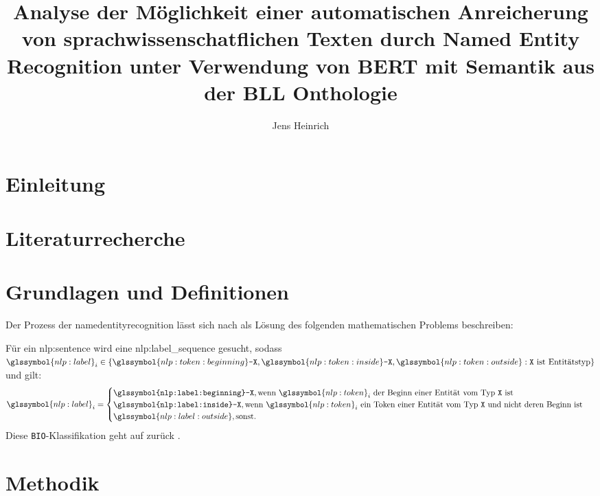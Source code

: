 \documentclass[
german,
]{bachelor}
\author{Jens Heinrich}
\title{%
Analyse der Möglichkeit
einer automatischen Anreicherung von sprachwissenschatflichen Texten
durch Named Entity Recognition
unter Verwendung von BERT
mit Semantik aus der BLL Onthologie%
}
\begin{document}
\maketitle

\tableofcontents

\section{Einleitung}

\section{Literaturrecherche}

\section{Grundlagen und Definitionen}
Der Prozess der \gls{namedentityrecognition}
lässt sich nach \autocite{Liang_2020} als Lösung des folgenden mathematischen Problems beschreiben:

\begin{prob}{}
Für ein \gls{nlp:sentence} 
wird eine \gls{nlp:label_sequence}  gesucht,
sodass \(
\glssymbol{nlp:label}_i \in
\left\lbrace
	\glssymbol{nlp:token:beginning}\texttt{-X},
	\glssymbol{nlp:token:inside}\texttt{-X},
	\glssymbol{nlp:token:outside}
	:
	\text{\texttt{X} ist Entitätstyp}
\right\rbrace
\)
und gilt:
\[
	\glssymbol{nlp:label}_i =
	\begin{cases}
		\texttt{\glssymbol{nlp:label:beginning}-X},
		\text{wenn \(\glssymbol{nlp:token}_i\)
		der Beginn einer Entität vom Typ \(\texttt{X}\) ist
	}\\
	\texttt{\glssymbol{nlp:label:inside}-X},
		\text{wenn \(\glssymbol{nlp:token}_i\)
		ein Token einer Entität vom Typ \(\texttt{X}\)
		und nicht deren Beginn ist
	}\\
	\glssymbol{nlp:label:outside}, \text{sonst}.
\end{cases}
\]
Diese \texttt{BIO}-Klassifikation geht auf \citeauthor{10.1145/2396761.2398506} zurück \autocite{10.1145/2396761.2398506}.
\end{prob}



\section{Methodik}
\end{document}
